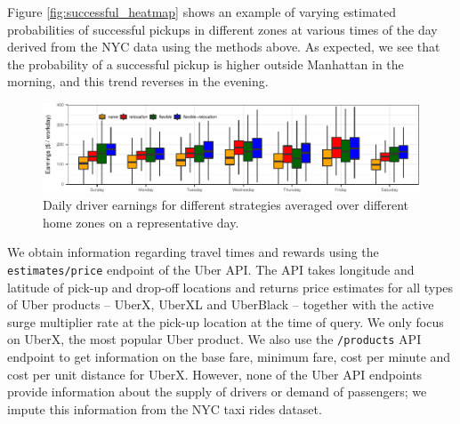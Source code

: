 Figure \ref{fig:successful_heatmap} shows an example of varying estimated probabilities of successful pickups 
  in different zones at various times of the day derived from the NYC data using the methods above. 
As expected, we see that the probability of a successful pickup is higher outside Manhattan in the morning, 
  and this trend reverses in the evening.

\begin{figure}
	\centering
	\includegraphics{figures/daily_simulated_earnings.pdf}
	\setlength{\belowcaptionskip}{-10pt}
	\caption{Daily driver earnings for different strategies averaged over different home zones on a representative day.}
	\label{fig:daily_earnings}
\end{figure}

 We obtain information regarding travel times and rewards using the \texttt{estimates/price} endpoint of the Uber API.
The API takes longitude and latitude of pick-up and drop-off locations and returns price estimates for all types of Uber products -- UberX, UberXL and UberBlack --  together with the active surge multiplier rate at the pick-up location at the time of query.  We only focus on UberX, the most popular Uber product. We also use the \texttt{/products} API endpoint to get information on the base fare, minimum fare, cost per minute and cost per unit distance for UberX. However, none of the Uber API endpoints provide information about the supply of  drivers or demand of passengers; we impute this 
information from the NYC taxi rides dataset.

